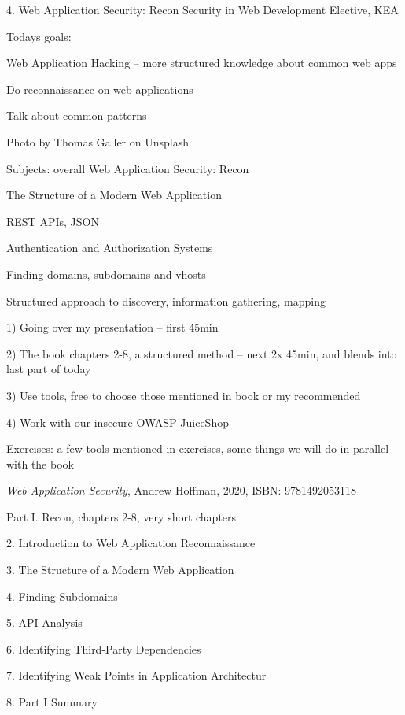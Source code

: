 \documentclass[Screen16to9,17pt]{foils}
\begin{document}
\mytitlepage
{4. Web Application Security: Recon}
{Security in Web Development Elective, KEA}



Todays goals:
\begin{list2}
\item Web Application Hacking -- more structured knowledge about common web apps
\item Do reconnaissance on web applications
\item Talk about common patterns
\end{list2}

{\small   Photo by Thomas Galler on Unsplash}




\begin{list1}
\item Subjects: overall Web Application Security: Recon
\item The Structure of a Modern Web Application
\item REST APIs, JSON
\item Authentication and Authorization Systems
\item Finding domains, subdomains and vhosts
\begin{list2}
\item Structured approach to discovery, information gathering, mapping
\item 1) Going over my presentation -- first 45min
\item 2) The book chapters 2-8, a structured method -- next 2x 45min, and blends into last part of today
\item 3) Use tools, free to choose those mentioned in book or my recommended
\item 4) Work with our insecure OWASP JuiceShop
\end{list2}
\item Exercises: a few tools mentioned in exercises, some things we will do in parallel with the book
\end{list1}



\emph{Web Application Security}, Andrew Hoffman, 2020, ISBN: 9781492053118

\begin{list1}
\item Part I. Recon, chapters 2-8, very short chapters
\item 2. Introduction to Web Application Reconnaissance
\item 3. The Structure of a Modern Web Application
\item 4. Finding Subdomains
\item 5. API Analysis
\item 6. Identifying Third-Party Dependencies
\item 7. Identifying Weak Points in Application Architectur
\item 8. Part I Summary
\end{list1}
\end{document}
